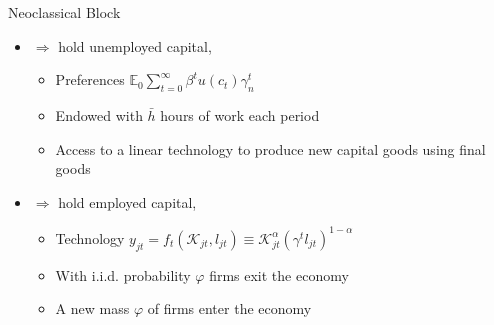 \documentclass[english,xcolor=svgnames,aspectratio=169]{beamer}
\begin{document}
\begin{frame}{Neoclassical Block}

\begin{itemize}

    \item {\color{dblue}{\bf Households}} $\Rightarrow$ hold unemployed capital, {\color{dred}{capital seller}} \medskip
    \begin{itemize}

    \item Preferences $\mathbb E_{0}\sum \limits_{t=0}^{\infty} \beta^{t} u(c_{t})\gamma^t_{n}$
 \medskip

    \item  Endowed with $\bar{h}$ hours of work each period \medskip

    \item Access to a linear technology to produce new capital goods using final goods

\end{itemize}

\bigskip

\item {\color{dblue}{\bf  Firms }} $\Rightarrow$ hold employed capital, {\color{dred}{capital buyer}} \medskip

\begin{itemize}
\item Technology $y_{jt}=f_{t}(\mathcal K_{jt}, l_{jt})\equiv\mathcal K_{jt}^\alpha (\gamma^t l_{jt})^{1-\alpha}$  \medskip

\item With i.i.d. probability $\varphi$ firms exit the economy  \medskip

\item A new mass $\varphi$ of firms enter the economy

\end{itemize}
\end{itemize}

\end{frame}
\end{document}
